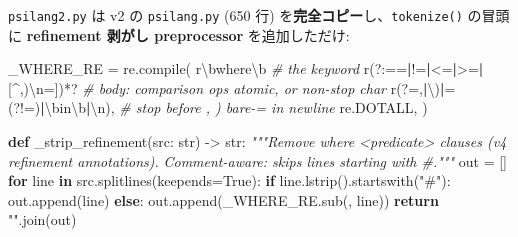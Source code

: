 \documentclass[
]{ltjsarticle}
\newenvironment{Shaded}{}{}
\newcommand{\BuiltInTok}[1]{\textcolor[rgb]{0.00,0.50,0.00}{#1}}
\newcommand{\CharTok}[1]{\textcolor[rgb]{0.25,0.44,0.63}{#1}}
\newcommand{\CommentTok}[1]{\textcolor[rgb]{0.38,0.63,0.69}{\textit{#1}}}
\newcommand{\ControlFlowTok}[1]{\textcolor[rgb]{0.00,0.44,0.13}{\textbf{#1}}}
\newcommand{\DecValTok}[1]{\textcolor[rgb]{0.25,0.63,0.44}{#1}}
\newcommand{\ExtensionTok}[1]{#1}
\newcommand{\FunctionTok}[1]{\textcolor[rgb]{0.02,0.16,0.49}{#1}}
\newcommand{\KeywordTok}[1]{\textcolor[rgb]{0.00,0.44,0.13}{\textbf{#1}}}
\newcommand{\NormalTok}[1]{#1}
\newcommand{\OperatorTok}[1]{\textcolor[rgb]{0.40,0.40,0.40}{#1}}
\newcommand{\PreprocessorTok}[1]{\textcolor[rgb]{0.74,0.48,0.00}{#1}}
\newcommand{\StringTok}[1]{\textcolor[rgb]{0.25,0.44,0.63}{#1}}
\newcommand{\VariableTok}[1]{\textcolor[rgb]{0.10,0.09,0.49}{#1}}
\newcommand{\VerbatimStringTok}[1]{\textcolor[rgb]{0.25,0.44,0.63}{#1}}
\begin{document}
\texttt{psilang2.py} は v2 の \texttt{psilang.py} (650 行)
を\textbf{完全コピー}し、\texttt{tokenize()} の冒頭に \textbf{refinement
剥がし preprocessor} を追加しただけ:

\begin{Shaded}
\begin{Highlighting}[]
\NormalTok{\_WHERE\_RE }\OperatorTok{=}\NormalTok{ re.}\BuiltInTok{compile}\NormalTok{(}
    \VerbatimStringTok{r\textquotesingle{}}\DecValTok{\textbackslash{}b}\VerbatimStringTok{where}\DecValTok{\textbackslash{}b}\VerbatimStringTok{\textquotesingle{}}                                \CommentTok{\# the keyword}
    \VerbatimStringTok{r\textquotesingle{}}\NormalTok{(?:}\VerbatimStringTok{==}\ControlFlowTok{|}\VerbatimStringTok{!=}\ControlFlowTok{|}\VerbatimStringTok{\textless{}=}\ControlFlowTok{|}\VerbatimStringTok{\textgreater{}=}\ControlFlowTok{|}\PreprocessorTok{[\^{},)}\CharTok{\textbackslash{}n}\PreprocessorTok{=]}\NormalTok{)}\OperatorTok{*?}\VerbatimStringTok{\textquotesingle{}}               \CommentTok{\# body: comparison ops atomic, or non{-}stop char}
    \VerbatimStringTok{r\textquotesingle{}}\ExtensionTok{(}\FunctionTok{?=}\VerbatimStringTok{,}\ControlFlowTok{|}\CharTok{\textbackslash{})}\ControlFlowTok{|}\VerbatimStringTok{=}\ExtensionTok{(}\FunctionTok{?!}\VerbatimStringTok{=}\ExtensionTok{)}\ControlFlowTok{|}\DecValTok{\textbackslash{}b}\VerbatimStringTok{in}\DecValTok{\textbackslash{}b}\ControlFlowTok{|}\CharTok{\textbackslash{}n}\ExtensionTok{)}\VerbatimStringTok{\textquotesingle{}}\NormalTok{,               }\CommentTok{\# stop before , ) bare{-}= in newline}
\NormalTok{    re.DOTALL,}
\NormalTok{)}

\KeywordTok{def}\NormalTok{ \_strip\_refinement(src: }\BuiltInTok{str}\NormalTok{) }\OperatorTok{{-}\textgreater{}} \BuiltInTok{str}\NormalTok{:}
    \CommentTok{"""Remove \textasciigrave{}where \textless{}predicate\textgreater{}\textasciigrave{} clauses (v4 refinement annotations).}
\CommentTok{    Comment{-}aware: skips lines starting with \textquotesingle{}\#\textquotesingle{}."""}
\NormalTok{    out }\OperatorTok{=}\NormalTok{ []}
    \ControlFlowTok{for}\NormalTok{ line }\KeywordTok{in}\NormalTok{ src.splitlines(keepends}\OperatorTok{=}\VariableTok{True}\NormalTok{):}
        \ControlFlowTok{if}\NormalTok{ line.lstrip().startswith(}\StringTok{"\#"}\NormalTok{):}
\NormalTok{            out.append(line)}
        \ControlFlowTok{else}\NormalTok{:}
\NormalTok{            out.append(\_WHERE\_RE.sub(}\StringTok{\textquotesingle{}\textquotesingle{}}\NormalTok{, line))}
    \ControlFlowTok{return} \StringTok{""}\NormalTok{.join(out)}
\end{Highlighting}
\end{Shaded}
\end{document}
